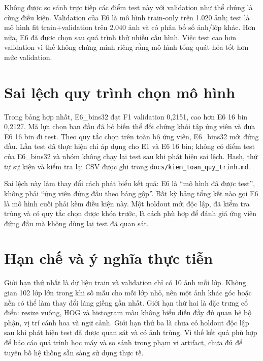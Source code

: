Không được so sánh trực tiếp các điểm test này với validation như thể chúng là cùng điều kiện. Validation của E6 là mô hình train-only trên 1.020 ảnh; test là mô hình fit train+validation trên 2.040 ảnh và có phân bố số ảnh/lớp khác. Hơn nữa, E6 đã được chọn sau quá trình thử nhiều cấu hình. Việc test cao hơn validation vì thế không chứng minh riêng rằng mô hình tổng quát hóa tốt hơn mức validation.

\section{Sai lệch quy trình chọn mô hình}
Trong bảng hợp nhất, E6\_bins32 đạt F1 validation 0,2151, cao hơn E6 16 bin 0,2127. Mã lựa chọn ban đầu đã bỏ biến thể đối chứng khỏi tập ứng viên và đưa E6 16 bin đi test. Theo quy tắc chọn trên toàn bộ ứng viên, E6\_bins32 mới đứng đầu. Lần test đã thực hiện chỉ áp dụng cho E1 và E6 16 bin; không có điểm test của E6\_bins32 và nhóm không chạy lại test sau khi phát hiện sai lệch. Hash, thứ tự sự kiện và kiểm tra lại CSV được ghi trong \texttt{docs/kiem\_toan\_quy\_trinh.md}.

Sai lệch này làm thay đổi cách phát biểu kết quả: E6 là ``mô hình đã được test'', không phải ``ứng viên đứng đầu theo bảng gộp''. Bất kỳ bảng tổng kết nào gọi E6 là mô hình cuối phải kèm điều kiện này. Một holdout mới độc lập, đã kiểm tra trùng và có quy tắc chọn được khóa trước, là cách phù hợp để đánh giá ứng viên đứng đầu mà không dùng lại test đã quan sát.

\section{Hạn chế và ý nghĩa thực tiễn}
Giới hạn thứ nhất là dữ liệu train và validation chỉ có 10 ảnh mỗi lớp. Không gian 102 lớp lớn trong khi số mẫu cho mỗi lớp nhỏ, nên một ảnh khác góc hoặc nền có thể làm thay đổi láng giềng gần nhất. Giới hạn thứ hai là đặc trưng cổ điển: resize vuông, HOG và histogram màu không biểu diễn đầy đủ quan hệ bộ phận, vị trí cánh hoa và ngữ cảnh. Giới hạn thứ ba là chưa có holdout độc lập sau khi phát hiện test đã được quan sát và có ảnh trùng. Vì thế kết quả phù hợp để báo cáo quá trình học máy và so sánh trong phạm vi artifact, chưa đủ để tuyên bố hệ thống sẵn sàng sử dụng thực tế.
